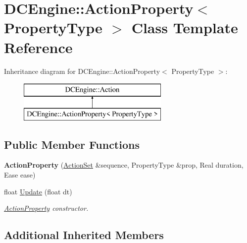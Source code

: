 \hypertarget{classDCEngine_1_1ActionProperty}{\section{D\-C\-Engine\-:\-:Action\-Property$<$ Property\-Type $>$ Class Template Reference}
\label{classDCEngine_1_1ActionProperty}
}
Inheritance diagram for D\-C\-Engine\-:\-:Action\-Property$<$ Property\-Type $>$\-:\begin{figure}[H]
\begin{center}
\leavevmode
\includegraphics[height=2.000000cm]{classDCEngine_1_1ActionProperty}
\end{center}
\end{figure}
\subsection*{Public Member Functions}
\begin{DoxyCompactItemize}
\item 
\hypertarget{classDCEngine_1_1ActionProperty_a5357b40640fb1fe77499eb6b5986b52b}{{\bfseries Action\-Property} (\hyperlink{classDCEngine_1_1ActionSet}{Action\-Set} \&sequence, Property\-Type \&prop, Real duration, Ease ease)}\label{classDCEngine_1_1ActionProperty_a5357b40640fb1fe77499eb6b5986b52b}

\item 
float \hyperlink{classDCEngine_1_1ActionProperty_aca45929048463086d5b05bb4287ab4f6}{Update} (float dt)
\begin{DoxyCompactList}\small\item\em \hyperlink{classDCEngine_1_1ActionProperty}{Action\-Property} constructor. \end{DoxyCompactList}\end{DoxyCompactItemize}
\subsection*{Additional Inherited Members}


